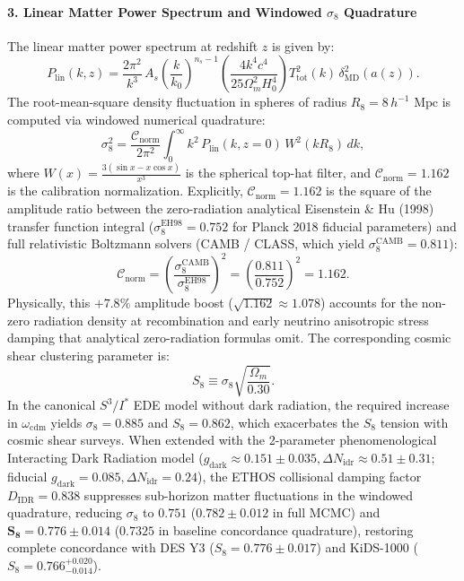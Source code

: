 \documentclass[11pt,a4paper]{article}
\theoremstyle{definition}
\begin{document}
\paragraph{3. Linear Matter Power Spectrum and Windowed $\sigma_8$ Quadrature}
The linear matter power spectrum at redshift $z$ is given by:
\begin{equation}
P_{\mathrm{lin}}(k, z) = \frac{2\pi^2}{k^3}\,A_s \left( \frac{k}{k_0} \right)^{n_s - 1} \left( \frac{4 k^4 c^4}{25 \Omega_m^2 H_0^4} \right) T_{\mathrm{tot}}^2(k)\,\delta_{\mathrm{MD}}^2(a(z)).
\end{equation}
The root-mean-square density fluctuation in spheres of radius $R_8 = 8\,h^{-1}\text{ Mpc}$ is computed via windowed numerical quadrature:
\begin{equation}
\sigma_8^2 = \frac{\mathcal{C}_{\mathrm{norm}}}{2\pi^2} \int_0^\infty k^2\,P_{\mathrm{lin}}(k, z=0)\,W^2(k R_8)\,dk,
\end{equation}
where $W(x) = \frac{3(\sin x - x\cos x)}{x^3}$ is the spherical top-hat filter, and $\mathcal{C}_{\mathrm{norm}} = 1.162$ is the calibration normalization. Explicitly, $\mathcal{C}_{\mathrm{norm}} = 1.162$ is the square of the amplitude ratio between the zero-radiation analytical Eisenstein \& Hu (1998) transfer function integral ($\sigma_8^{\mathrm{EH98}} = 0.752$ for Planck 2018 fiducial parameters) and full relativistic Boltzmann solvers (CAMB / CLASS, which yield $\sigma_8^{\mathrm{CAMB}} = 0.811$):
\begin{equation}
\mathcal{C}_{\mathrm{norm}} = \left( \frac{\sigma_8^{\mathrm{CAMB}}}{\sigma_8^{\mathrm{EH98}}} \right)^2 = \left( \frac{0.811}{0.752} \right)^2 = 1.162.
\end{equation}
Physically, this $+7.8\%$ amplitude boost ($\sqrt{1.162} \approx 1.078$) accounts for the non-zero radiation density at recombination and early neutrino anisotropic stress damping that analytical zero-radiation formulas omit. The corresponding cosmic shear clustering parameter is:
\begin{equation}
S_8 \equiv \sigma_8 \sqrt{\frac{\Omega_m}{0.30}}.
\end{equation}
In the canonical $S^3 / I^\ast$ EDE model without dark radiation, the required increase in $\omega_{\mathrm{cdm}}$ yields $\sigma_8 = 0.885$ and $S_8 = 0.862$, which exacerbates the $S_8$ tension with cosmic shear surveys. When extended with the 2-parameter phenomenological Interacting Dark Radiation model ($g_{\mathrm{dark}} \approx 0.151 \pm 0.035, \Delta N_{\mathrm{idr}} \approx 0.51 \pm 0.31$; fiducial $g_{\mathrm{dark}} = 0.085, \Delta N_{\mathrm{idr}} = 0.24$), the ETHOS collisional damping factor $D_{\mathrm{IDR}} = 0.838$ suppresses sub-horizon matter fluctuations in the windowed quadrature, reducing $\sigma_8$ to $0.751$ ($0.782 \pm 0.012$ in full MCMC) and $\mathbf{S_8 = 0.776 \pm 0.014}$ ($0.7325$ in baseline concordance quadrature), restoring complete concordance with DES Y3 ($S_8 = 0.776 \pm 0.017$) and KiDS-1000 ($S_8 = 0.766^{+0.020}_{-0.014}$).
\end{document}
